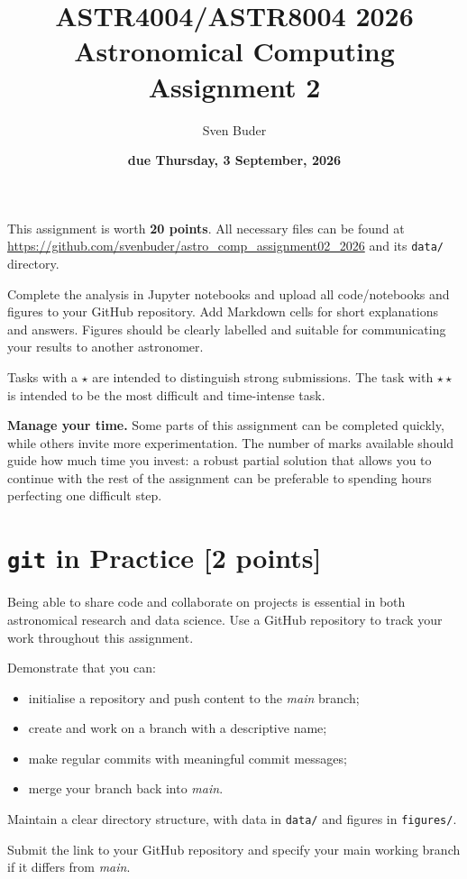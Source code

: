 \documentclass[a4paper,12pt]{article}
\title{\vspace{-1cm}\Huge{ASTR4004/ASTR8004 2026\\Astronomical Computing Assignment 2}}
\author{Sven Buder}
\date{\textbf{due Thursday, 3 September, 2026}}
\begin{document}
\maketitle

This assignment is worth \textbf{20 points}. All necessary files can be found at \url{https://github.com/svenbuder/astro_comp_assignment02_2026} and its \texttt{data/} directory.

Complete the analysis in Jupyter notebooks and upload all code/notebooks and figures to your GitHub repository. Add Markdown cells for short explanations and answers. Figures should be clearly labelled and suitable for communicating your results to another astronomer.

Tasks with a $\star$ are intended to distinguish strong submissions. The task with $\star\star$ is intended to be the most difficult and time-intense task.

\textbf{Manage your time.} Some parts of this assignment can be completed quickly, while others invite more experimentation. The number of marks available should guide how much time you invest: a robust partial solution that allows you to continue with the rest of the assignment can be preferable to spending hours perfecting one difficult step.


\section{\texttt{git} in Practice \hfill [2 points]}

Being able to share code and collaborate on projects is essential in both astronomical research and data science. Use a GitHub repository to track your work throughout this assignment.

Demonstrate that you can:

\begin{itemize}
    \item initialise a repository and push content to the \textit{main} branch;
    \item create and work on a branch with a descriptive name;
    \item make regular commits with meaningful commit messages;
    \item merge your branch back into \textit{main}.
\end{itemize}

Maintain a clear directory structure, with data in \texttt{data/} and figures in \texttt{figures/}.

Submit the link to your GitHub repository and specify your main working branch if it differs from \textit{main}.
\end{document}
